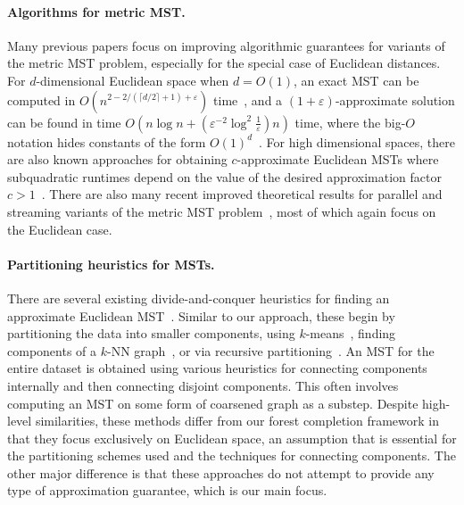 \paragraph{Algorithms for metric MST.}
Many previous papers focus on improving algorithmic guarantees for variants of the metric MST problem, especially for the special case of Euclidean distances. For $d$-dimensional Euclidean space when $d = O(1)$, an exact MST can be computed in $O(n^{2 - 2/(\lceil d/2 \rceil + 1) + \varepsilon})$ time~\cite{agarwal1990euclidean}, and a $(1+\varepsilon)$-approximate solution can be found in time $O(n \log n + (\varepsilon^{-2} \log^2 \frac{1}{\varepsilon})n)$ time, where the big-$O$ notation hides constants of the form $O(1)^d$~\cite{arya2016fast}. For high dimensional spaces, there are also known approaches for obtaining $c$-approximate Euclidean MSTs where subquadratic runtimes depend on the value of the desired approximation factor $c > 1$~\cite{har2013euclidean,harpeled2012ann}. There are also many recent improved theoretical results for parallel and streaming variants of the metric MST problem~\cite{jayaram2024massively,chen2022new,chen2023streamingemst,wang2021fast,azarmehr2024massively,march2010fast}, most of which again focus on the Euclidean case.

\paragraph{Partitioning heuristics for MSTs.}
There are several existing divide-and-conquer heuristics for finding an approximate Euclidean MST~\cite{chen2013clustering,zhong2015fast,mishra2020efficient,jothi2018fast}. Similar to our approach, these begin by partitioning the data into smaller components, using $k$-means~\cite{zhong2015fast,jothi2018fast}, finding components of a $k$-NN graph~\cite{chen2013clustering}, or via recursive partitioning~\cite{mishra2020efficient}. An MST for the entire dataset is obtained using various heuristics for connecting components internally and then connecting disjoint components. This often involves computing an MST on some form of coarsened graph as a substep. Despite high-level similarities, these methods differ from our forest completion framework in that they focus exclusively on Euclidean space, an assumption that is essential for the partitioning schemes used and the techniques for connecting components. The other major difference is that these approaches do not attempt to provide any type of approximation guarantee, which is our main focus.

